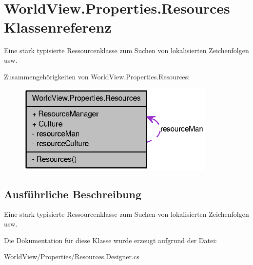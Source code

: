 \hypertarget{class_world_view_1_1_properties_1_1_resources}{
\section{WorldView.Properties.Resources Klassenreferenz}
\label{class_world_view_1_1_properties_1_1_resources}
}


Eine stark typisierte Ressourcenklasse zum Suchen von lokalisierten Zeichenfolgen usw.  




Zusammengehörigkeiten von WorldView.Properties.Resources:\nopagebreak
\begin{figure}[H]
\begin{center}
\leavevmode
\includegraphics[width=279pt]{class_world_view_1_1_properties_1_1_resources__coll__graph}
\end{center}
\end{figure}


\subsection{Ausführliche Beschreibung}
Eine stark typisierte Ressourcenklasse zum Suchen von lokalisierten Zeichenfolgen usw. 

Die Dokumentation für diese Klasse wurde erzeugt aufgrund der Datei:\begin{DoxyCompactItemize}
\item 
WorldView/Properties/Resources.Designer.cs\end{DoxyCompactItemize}
